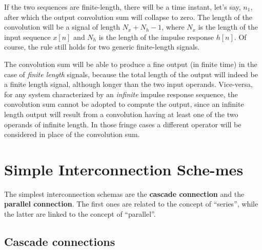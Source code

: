 \documentclass[\documentfontsize, twocolumn]{\classname}
\begin{document}
If the two sequences are finite-length, there will be a time instant, let's say, $n_1$, after which the output convolution sum will collapse to zero. The length of the convolution will be a signal of length $N_x + N_h - 1$, where $N_x$ is the length of the input sequence $x[n]$ and $N_h$ is the length of the impulse response $h[n]$. Of course, the rule still holds for two generic finite-length signals.

The convolution sum will be able to produce a fine output (in finite time) in the case of \emph{finite length} signals, because the total length of the output will indeed be a finite length signal, although longer than the two input operands. Vice-versa, for any system characterized by an \emph{infinite} impulse response sequence, the convolution sum cannot be adopted to compute the output, since an infinite length output will result from a convolution having at least one of the two operands of infinite length. In those fringe cases a different operator will be considered in place of the convolution sum.

\section{Simple Interconnection Sche-mes}

The simplest interconnection schemas are the \textbf{cascade connection} and the \textbf{parallel connection}. The first ones are related to the concept of ``series'', while the latter are linked to the concept of ``parallel''.

\subsection{Cascade connections}
\end{document}
